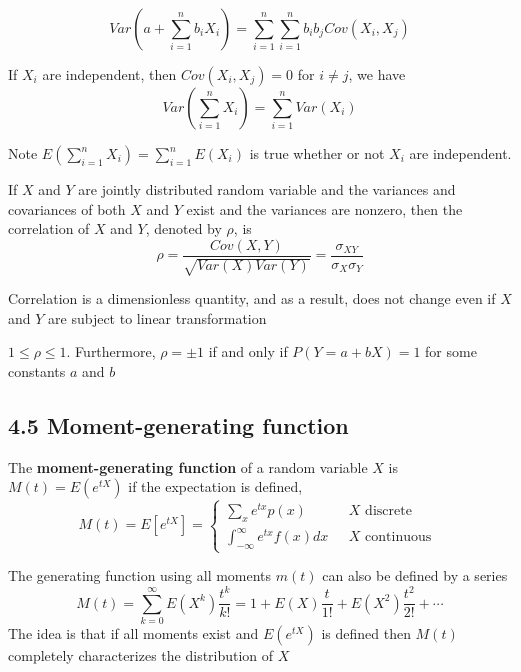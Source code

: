 \documentclass[11pt]{article}
\begin{document}
\begin{corollary*}
  \[
    Var(a + \sum_{i=1}^{n} b_i X_i) = \sum_{i=1}^{n} \sum_{i=1}^{n} b_i b_j Cov(X_i, X_j)
  \]
\end{corollary*}

\begin{corollary*}
  If $X_i$ are independent, then $Cov(X_i, X_j) = 0$ for $i\neq j$, we have
  \[
    Var(\sum_{i=1}^{n} X_i) = \sum_{i=1}^{n}Var(X_i)
  \]
  \begin{rem}
    Note $E(\sum_{i=1}^{n} X_i) = \sum_{i=1}^{n}E(X_i)$ is true whether or not $X_i$ are independent.
  \end{rem}
\end{corollary*}

\begin{defn*}
  If $X$ and $Y$ are jointly distributed random variable and the variances and covariances of both $X$ and $Y$ exist and the variances are nonzero, then the correlation of $X$ and $Y$, denoted by $\rho$, is
  \[
    \rho = \frac{Cov(X,Y)}{\sqrt{Var(X)Var(Y)}} = \frac{\sigma_{XY}}{\sigma_X \sigma_Y}
  \]
  \begin{rem}
      Correlation is a dimensionless quantity, and as a result, does not change even if $X$ and $Y$ are subject to linear transformation
  \end{rem}
\end{defn*}

\begin{theorem*}
  $1\leq \rho \leq 1$. Furthermore, $\rho = \pm 1$ if and only if $P(Y = a+bX) =1$ for some constants $a$ and $b$
\end{theorem*}


\subsection*{4.5 Moment-generating function}

\begin{defn*}
  The \textbf{moment-generating function} of a random variable $X$ is $M(t) = E(e^{tX})$ if the expectation is defined,
  \[
    M(t) = E[e^{tX}] =
    \begin{cases}
      \sum_{x} e^{tx} p(x) & \text{ $X$ discrete }\\
      \int_{-\infty}^{\infty} e^{tx} f(x) dx & \text{ $X$ continuous }
     \end{cases}
  \]
  \begin{rem}
    The generating function using all moments $m(t)$ can also be defined by a series
    \[
      M(t) = \sum_{k=0}^{\infty} E(X^k)\frac{t^k}{k!} = 1  + E(X)\frac{t}{1!} + E(X^2)\frac{t^2}{2!} + \cdots
    \]
    The idea is that if all moments exist and $E(e^{tX})$ is defined then $M(t)$ completely characterizes the distribution of $X$
  \end{rem}
\end{defn*}
\end{document}

